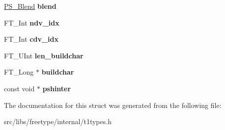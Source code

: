 \begin{DoxyCompactItemize}
\item 
\hypertarget{struct_t1___face_rec___a51e4e76f9988ec601d1fec6b5d4611db}{
\hyperlink{struct_p_s___blend_rec__}{PS\_\-Blend} {\bfseries blend}}
\label{struct_t1___face_rec___a51e4e76f9988ec601d1fec6b5d4611db}

\item 
\hypertarget{struct_t1___face_rec___a0ecadea7618642ccc351f81ac56ec266}{
FT\_\-Int {\bfseries ndv\_\-idx}}
\label{struct_t1___face_rec___a0ecadea7618642ccc351f81ac56ec266}

\item 
\hypertarget{struct_t1___face_rec___a7a77dcddf65ac6d86f1f62b3859d11d8}{
FT\_\-Int {\bfseries cdv\_\-idx}}
\label{struct_t1___face_rec___a7a77dcddf65ac6d86f1f62b3859d11d8}

\item 
\hypertarget{struct_t1___face_rec___a75554021d0baddb1c64f69fd8dbde86b}{
FT\_\-UInt {\bfseries len\_\-buildchar}}
\label{struct_t1___face_rec___a75554021d0baddb1c64f69fd8dbde86b}

\item 
\hypertarget{struct_t1___face_rec___af1fd890acaa0f423f7cc36807c42d75f}{
FT\_\-Long $\ast$ {\bfseries buildchar}}
\label{struct_t1___face_rec___af1fd890acaa0f423f7cc36807c42d75f}

\item 
\hypertarget{struct_t1___face_rec___a438e8ce8cbd53b7e205b17f95e7b2106}{
const void $\ast$ {\bfseries pshinter}}
\label{struct_t1___face_rec___a438e8ce8cbd53b7e205b17f95e7b2106}

\end{DoxyCompactItemize}


The documentation for this struct was generated from the following file:\begin{DoxyCompactItemize}
\item 
src/libs/freetype/internal/t1types.h\end{DoxyCompactItemize}
